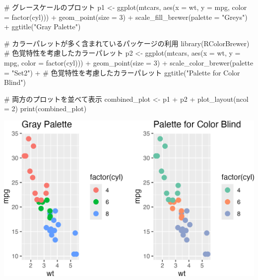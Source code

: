\documentclass[
  a4paper,
]{ltjsbook}
\newenvironment{Shaded}{\begin{snugshade}}{\end{snugshade}}
\newcommand{\AttributeTok}[1]{\textcolor[rgb]{0.40,0.45,0.13}{#1}}
\newcommand{\CommentTok}[1]{\textcolor[rgb]{0.37,0.37,0.37}{#1}}
\newcommand{\DecValTok}[1]{\textcolor[rgb]{0.68,0.00,0.00}{#1}}
\newcommand{\FunctionTok}[1]{\textcolor[rgb]{0.28,0.35,0.67}{#1}}
\newcommand{\NormalTok}[1]{\textcolor[rgb]{0.00,0.23,0.31}{#1}}
\newcommand{\OtherTok}[1]{\textcolor[rgb]{0.00,0.23,0.31}{#1}}
\newcommand{\SpecialCharTok}[1]{\textcolor[rgb]{0.37,0.37,0.37}{#1}}
\newcommand{\StringTok}[1]{\textcolor[rgb]{0.13,0.47,0.30}{#1}}
\begin{document}
\begin{Shaded}
\begin{Highlighting}[]
\CommentTok{\# グレースケールのプロット}
\NormalTok{p1 }\OtherTok{\textless{}{-}} \FunctionTok{ggplot}\NormalTok{(mtcars, }\FunctionTok{aes}\NormalTok{(}\AttributeTok{x =}\NormalTok{ wt, }\AttributeTok{y =}\NormalTok{ mpg, }\AttributeTok{color =} \FunctionTok{factor}\NormalTok{(cyl))) }\SpecialCharTok{+}
  \FunctionTok{geom\_point}\NormalTok{(}\AttributeTok{size =} \DecValTok{3}\NormalTok{) }\SpecialCharTok{+}
  \FunctionTok{scale\_fill\_brewer}\NormalTok{(}\AttributeTok{palette =} \StringTok{"Greys"}\NormalTok{) }\SpecialCharTok{+}
  \FunctionTok{ggtitle}\NormalTok{(}\StringTok{"Gray Palette"}\NormalTok{)}

\CommentTok{\# カラーパレットが多く含まれているパッケージの利用}
\FunctionTok{library}\NormalTok{(RColorBrewer)}
\CommentTok{\# 色覚特性を考慮したカラーパレット}
\NormalTok{p2 }\OtherTok{\textless{}{-}} \FunctionTok{ggplot}\NormalTok{(mtcars, }\FunctionTok{aes}\NormalTok{(}\AttributeTok{x =}\NormalTok{ wt, }\AttributeTok{y =}\NormalTok{ mpg, }\AttributeTok{color =} \FunctionTok{factor}\NormalTok{(cyl))) }\SpecialCharTok{+}
  \FunctionTok{geom\_point}\NormalTok{(}\AttributeTok{size =} \DecValTok{3}\NormalTok{) }\SpecialCharTok{+}
  \FunctionTok{scale\_color\_brewer}\NormalTok{(}\AttributeTok{palette =} \StringTok{"Set2"}\NormalTok{) }\SpecialCharTok{+} \CommentTok{\# 色覚特性を考慮したカラーパレット}
  \FunctionTok{ggtitle}\NormalTok{(}\StringTok{"Palette for Color Blind"}\NormalTok{)}

\CommentTok{\# 両方のプロットを並べて表示}
\NormalTok{combined\_plot }\OtherTok{\textless{}{-}}\NormalTok{ p1 }\SpecialCharTok{+}\NormalTok{ p2 }\SpecialCharTok{+} \FunctionTok{plot\_layout}\NormalTok{(}\AttributeTok{ncol =} \DecValTok{2}\NormalTok{)}
\FunctionTok{print}\NormalTok{(combined\_plot)}
\end{Highlighting}
\end{Shaded}

\includegraphics{chapter04_files/figure-pdf/unnamed-chunk-2-1.png}
\end{document}
